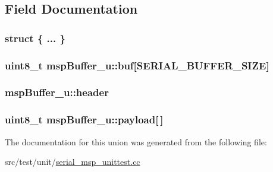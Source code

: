 \subsection{Field Documentation}
\hypertarget{unionmspBuffer__u_aace1a7f239650b4307d2361b3530e91f}{\subsubsection[{"@27}]{\setlength{\rightskip}{0pt plus 5cm}struct \{ ... \} }}\label{unionmspBuffer__u_aace1a7f239650b4307d2361b3530e91f}
\hypertarget{unionmspBuffer__u_ae36bb9e208f32a962146f743f176ea03}{
\subsubsection[{buf}]{\setlength{\rightskip}{0pt plus 5cm}uint8\+\_\+t msp\+Buffer\+\_\+u\+::buf\mbox{[}{\bf S\+E\+R\+I\+A\+L\+\_\+\+B\+U\+F\+F\+E\+R\+\_\+\+S\+I\+Z\+E}\mbox{]}}}\label{unionmspBuffer__u_ae36bb9e208f32a962146f743f176ea03}
\hypertarget{unionmspBuffer__u_ace384d3e7e735ad32e9753be0f49e51d}{
\subsubsection[{header}]{ msp\+Buffer\+\_\+u\+::header}}\label{unionmspBuffer__u_ace384d3e7e735ad32e9753be0f49e51d}
\hypertarget{unionmspBuffer__u_a2b4ff5b9f14ac0b5730ffc6f81799640}{
\subsubsection[{payload}]{\setlength{\rightskip}{0pt plus 5cm}uint8\+\_\+t msp\+Buffer\+\_\+u\+::payload\mbox{[}$\,$\mbox{]}}}\label{unionmspBuffer__u_a2b4ff5b9f14ac0b5730ffc6f81799640}


The documentation for this union was generated from the following file\+:\begin{DoxyCompactItemize}
\item 
src/test/unit/\hyperlink{serial__msp__unittest_8cc}{serial\+\_\+msp\+\_\+unittest.\+cc}\end{DoxyCompactItemize}
